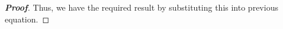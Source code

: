 \begin{proof}[\bf Proof]
Thus, we have the required result by substituting this into previous equation.
\end{proof}








